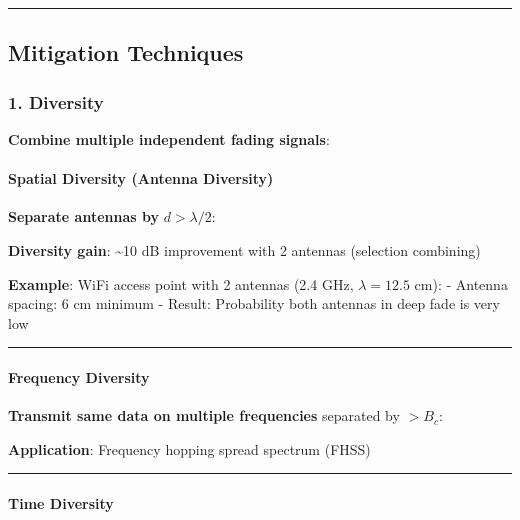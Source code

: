 \begin{center}\rule{0.5\linewidth}{0.5pt}\end{center}

\subsection{Mitigation Techniques}\label{mitigation-techniques}

\subsubsection{1. Diversity}\label{diversity}

\textbf{Combine multiple independent fading signals}:

\paragraph{Spatial Diversity (Antenna
Diversity)}\label{spatial-diversity-antenna-diversity}

\textbf{Separate antennas by} \(d > \lambda/2\):

\textbf{Diversity gain}: \textasciitilde10 dB improvement with 2
antennas (selection combining)

\textbf{Example}: WiFi access point with 2 antennas (2.4 GHz,
\(\lambda = 12.5\) cm): - Antenna spacing: 6 cm minimum - Result:
Probability both antennas in deep fade is very low

\begin{center}\rule{0.5\linewidth}{0.5pt}\end{center}

\paragraph{Frequency Diversity}\label{frequency-diversity}

\textbf{Transmit same data on multiple frequencies} separated by
\(> B_c\):

\textbf{Application}: Frequency hopping spread spectrum (FHSS)

\begin{center}\rule{0.5\linewidth}{0.5pt}\end{center}

\paragraph{Time Diversity}\label{time-diversity}

